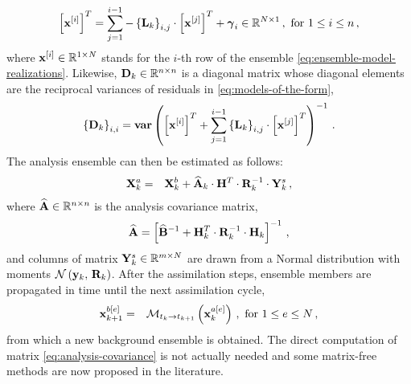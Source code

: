 \begin{eqnarray}
\label{eq:models-of-the-form}
\displaystyle
\left [ {\bf x}^{[i]} \right ]^T = \sum_{j=1}^{i-1} - \left \{  {\bf L}_k \right \}_{i,j} \cdot \left [ {\bf x}^{[j]} \right ]^T + \boldsymbol{\gamma}_i \in \mathbb{R}^{N \times 1} \,, \text{ for $1 \le i \le n$} \,,
\end{eqnarray}
%
where ${\bf x}^{[i]} \in \mathbb{R}^{1 \times N}$ stands for the $i$-th row of the ensemble \eqref{eq:ensemble-model-realizations}. Likewise, ${\bf D}_k \in \mathbb{R}^{n \times n}$ is a diagonal matrix whose diagonal elements are the reciprocal variances of residuals in \eqref{eq:models-of-the-form},
\begin{eqnarray}
\left \{ {\bf D}_k \right \}_{i,i} = {\bf var} \left ( \left [ {\bf x}^{[i]} \right ]^T + \sum_{j=1}^{i-1} \left \{  {\bf L}_k \right \}_{i,j} \cdot \left [ {\bf x}^{[j]} \right ]^T \right )^{-1} \,.
\end{eqnarray}
%
The analysis ensemble can then be estimated as follows:
\begin{eqnarray}
{\bf X}^a_k &=& {\bf X}^b_k + \widehat{\bf A}_k \cdot {\bf H}^T \cdot {\bf R}_k^{-1} \cdot {\bf Y}^s_k \,,
\end{eqnarray}
%
where $\widehat{\bf A} \in \mathbb{R}^{n \times n}$ is the analysis covariance matrix,
\begin{eqnarray}
\label{eq:analysis-covariance}
\displaystyle
\widehat{\bf A} = \left [ \widehat{\bf B}^{-1} + {\bf H}_k^T \cdot {\bf R}^{-1}_k \cdot {\bf H}_k \right ]^{-1} \,,
\end{eqnarray} 
%
and columns of matrix ${\bf Y}^s_k \in \mathbb{R}^{m \times N}$ are drawn from a Normal distribution with moments $\mathcal{N} \left ( {\bf y}_k,\,{\bf R}_k \right )$. After the assimilation steps, ensemble members are propagated in time until the next assimilation cycle,
\begin{eqnarray*}
\displaystyle
{\bf x}^{b[e]}_{k+1} &=& \mathcal{M}_{t_{k} \rightarrow t_{k+1}} \left ( {\bf x}^{a[e]}_{k} \right ) \,,  \text{ for $1 \le e \le N$} \,,
\end{eqnarray*}
%
from which a new background ensemble is obtained. The direct computation of matrix \eqref{eq:analysis-covariance} is not actually needed and some matrix-free methods are now proposed in the literature.
